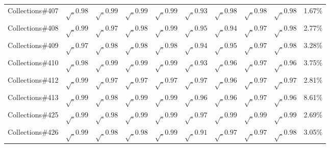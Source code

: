 \begin{table}[h!]
\begin{tabular}{lccccccccc}
    Collections\#407     & $\surd_{0.98}$  & $\surd_{0.99}$ & $\surd_{0.99}$ & $\surd_{0.99}$ & $\surd_{0.93}$ & $\surd_{0.98}$ & $\surd_{0.98}$ & $\surd_{0.98}$ & 1.67\% \\
    Collections\#408     & $\surd_{0.99}$  & $\surd_{0.97}$ & $\surd_{0.98}$ & $\surd_{0.99}$ & $\surd_{0.95}$ & $\surd_{0.94}$ & $\surd_{0.97}$ & $\surd_{0.98}$ & 2.77\% \\
    Collections\#409     & $\surd_{0.97}$  & $\surd_{0.98}$ & $\surd_{0.98}$ & $\surd_{0.98}$ & $\surd_{0.94}$ & $\surd_{0.95}$ & $\surd_{0.97}$ & $\surd_{0.98}$ & 3.28\% \\
    Collections\#410     & $\surd_{0.98}$  & $\surd_{0.99}$ & $\surd_{0.99}$ & $\surd_{0.99}$ & $\surd_{0.93}$ & $\surd_{0.96}$ & $\surd_{0.97}$ & $\surd_{0.96}$ & 3.75\% \\
    Collections\#412     & $\surd_{0.99}$  & $\surd_{0.97}$ & $\surd_{0.97}$ & $\surd_{0.97}$ & $\surd_{0.97}$ & $\surd_{0.96}$ & $\surd_{0.97}$ & $\surd_{0.97}$ & 2.81\% \\
    Collections\#413    & $\surd_{0.99}$  & $\surd_{0.98}$ & $\surd_{0.99}$ & $\surd_{0.99}$ & $\surd_{0.96}$ & $\surd_{0.96}$ & $\surd_{0.97}$ & $\surd_{0.96}$ & 8.61\% \\
    Collections\#425     & $\surd_{0.99}$  & $\surd_{0.98}$ & $\surd_{0.99}$ & $\surd_{0.99}$ & $\surd_{0.97}$ & $\surd_{0.99}$ & $\surd_{0.99}$ & $\surd_{0.99}$ & 2.69\% \\
    Collections\#426     & $\surd_{0.99}$  & $\surd_{0.98}$ & $\surd_{0.98}$ & $\surd_{0.99}$ & $\surd_{0.91}$ & $\surd_{0.97}$ & $\surd_{0.97}$ & $\surd_{0.98}$ & 3.05\% \\


\end{tabular}
\end{table}
